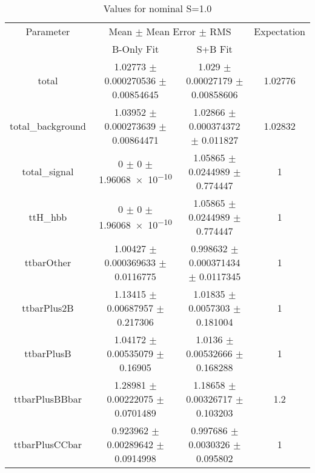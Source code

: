 \begin{table}
\centering
\caption{Values for nominal S=1.0}
\begin{tabular}{cccc}
\toprule
Parameter & \multicolumn{2}{c}{Mean $\pm$ Mean Error $\pm$ RMS} & Expectation\\
 & B-Only Fit & S+B Fit & \\
\midrule
total & \num{1.02773} $\pm$ \num{0.000270536} $\pm$ \num{0.00854645} & \num{1.029} $\pm$ \num{0.00027179} $\pm$ \num{0.00858606} & \num{1.02776}\\
total\_background & \num{1.03952} $\pm$ \num{0.000273639} $\pm$ \num{0.00864471} & \num{1.02866} $\pm$ \num{0.000374372} $\pm$ \num{0.011827} & \num{1.02832}\\
total\_signal & \num{0} $\pm$ \num{0} $\pm$ \num{1.96068e-10} & \num{1.05865} $\pm$ \num{0.0244989} $\pm$ \num{0.774447} & \num{1}\\
ttH\_hbb & \num{0} $\pm$ \num{0} $\pm$ \num{1.96068e-10} & \num{1.05865} $\pm$ \num{0.0244989} $\pm$ \num{0.774447} & \num{1}\\
ttbarOther & \num{1.00427} $\pm$ \num{0.000369633} $\pm$ \num{0.0116775} & \num{0.998632} $\pm$ \num{0.000371434} $\pm$ \num{0.0117345} & \num{1}\\
ttbarPlus2B & \num{1.13415} $\pm$ \num{0.00687957} $\pm$ \num{0.217306} & \num{1.01835} $\pm$ \num{0.0057303} $\pm$ \num{0.181004} & \num{1}\\
ttbarPlusB & \num{1.04172} $\pm$ \num{0.00535079} $\pm$ \num{0.16905} & \num{1.0136} $\pm$ \num{0.00532666} $\pm$ \num{0.168288} & \num{1}\\
ttbarPlusBBbar & \num{1.28981} $\pm$ \num{0.00222075} $\pm$ \num{0.0701489} & \num{1.18658} $\pm$ \num{0.00326717} $\pm$ \num{0.103203} & \num{1.2}\\
ttbarPlusCCbar & \num{0.923962} $\pm$ \num{0.00289642} $\pm$ \num{0.0914998} & \num{0.997686} $\pm$ \num{0.0030326} $\pm$ \num{0.095802} & \num{1}\\
\bottomrule
\end{tabular}
\end{table}